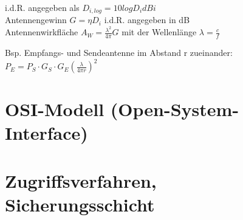 \documentclass[fs, footer]{latex4ei}
\begin{document}
\begin{multicols*}{4}
{	i.d.R. angegeben als $D_{i,log} = 10 log D_i dBi $ \\
	
	Antennengewinn $ G = \eta D_i$ i.d.R. angegeben in dB \\
	
	Antennenwirkfläche $ A_W = \frac{\lambda^2}{4 \pi} G $
	mit der Wellenlänge $\lambda = \frac{c}{f}$
	
	Bsp. Empfangs- und Sendeantenne im Abstand r zueinander: \\ $P_E = P_S \cdot G_S \cdot G_E (\frac{\lambda}{4 \pi r})^2$ \\
}

\section{OSI-Modell (Open-System-Interface)}




\section{Zugriffsverfahren, Sicherungsschicht}


\end{multicols*}
\end{document}
